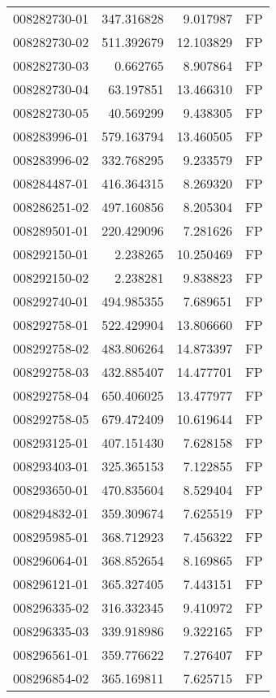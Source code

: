 \begin{tabular}{lrrl}
008282730-01 &  347.316828 &     9.017987 &   FP \\
008282730-02 &  511.392679 &    12.103829 &   FP \\
008282730-03 &    0.662765 &     8.907864 &   FP \\
008282730-04 &   63.197851 &    13.466310 &   FP \\
008282730-05 &   40.569299 &     9.438305 &   FP \\
008283996-01 &  579.163794 &    13.460505 &   FP \\
008283996-02 &  332.768295 &     9.233579 &   FP \\
008284487-01 &  416.364315 &     8.269320 &   FP \\
008286251-02 &  497.160856 &     8.205304 &   FP \\
008289501-01 &  220.429096 &     7.281626 &   FP \\
008292150-01 &    2.238265 &    10.250469 &   FP \\
008292150-02 &    2.238281 &     9.838823 &   FP \\
008292740-01 &  494.985355 &     7.689651 &   FP \\
008292758-01 &  522.429904 &    13.806660 &   FP \\
008292758-02 &  483.806264 &    14.873397 &   FP \\
008292758-03 &  432.885407 &    14.477701 &   FP \\
008292758-04 &  650.406025 &    13.477977 &   FP \\
008292758-05 &  679.472409 &    10.619644 &   FP \\
008293125-01 &  407.151430 &     7.628158 &   FP \\
008293403-01 &  325.365153 &     7.122855 &   FP \\
008293650-01 &  470.835604 &     8.529404 &   FP \\
008294832-01 &  359.309674 &     7.625519 &   FP \\
008295985-01 &  368.712923 &     7.456322 &   FP \\
008296064-01 &  368.852654 &     8.169865 &   FP \\
008296121-01 &  365.327405 &     7.443151 &   FP \\
008296335-02 &  316.332345 &     9.410972 &   FP \\
008296335-03 &  339.918986 &     9.322165 &   FP \\
008296561-01 &  359.776622 &     7.276407 &   FP \\
008296854-02 &  365.169811 &     7.625715 &   FP \\

\end{tabular}
